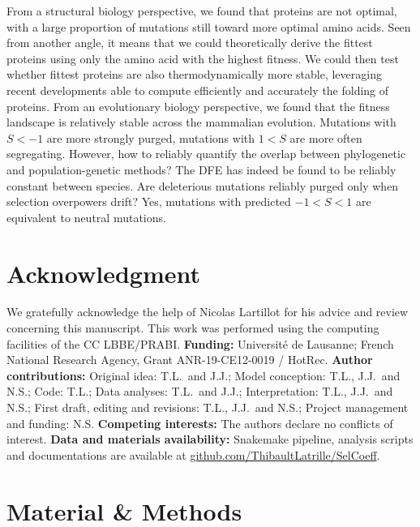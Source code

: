 \documentclass{article}
\newcommand{\Sphy}{S}
\begin{document}
    From a structural biology perspective, we found that proteins are not optimal, with a large proportion of mutations still toward more optimal amino acids.
    Seen from another angle, it means that we could theoretically derive the fittest proteins using only the amino acid with the highest fitness.
    We could then test whether fittest proteins are also thermodynamically more stable, leveraging recent developments able to compute efficiently and accurately the folding of proteins.
    From an evolutionary biology perspective, we found that the fitness landscape is relatively stable across the mammalian evolution.
    Mutations with $\Sphy<-1$ are more strongly purged, mutations with $1<\Sphy$ are more often segregating.
    However, how to reliably quantify the overlap between phylogenetic and population-genetic methods?
    The DFE has indeed be found to be reliably constant between species\cite{castellano_comparison_2019}.
    Are deleterious mutations reliably purged only when selection overpowers drift?
    Yes, mutations with predicted $-1<\Sphy<1$ are equivalent to neutral mutations.


    \section*{Acknowledgment}
    \label{sec:acknowledgment}
    We gratefully acknowledge the help of Nicolas Lartillot for his advice and review concerning this manuscript.
    This work was performed using the computing facilities of the CC LBBE/PRABI\@.
    \textbf{Funding:}
    Université de Lausanne;
    French National Research Agency, Grant ANR-19-CE12-0019 / HotRec.
    \textbf{Author contributions:}
    Original idea: T.L.\ and J.J.;
    Model conception: T.L., J.J.\ and N.S.;
    Code: T.L.;
    Data analyses: T.L.\ and J.J.;
    Interpretation: T.L., J.J.\ and N.S.;
    First draft, editing and revisions: T.L., J.J.\ and N.S.;
    Project management and funding: N.S\@.
    \textbf{Competing interests:}
    The authors declare no conflicts of interest.
    \textbf{Data and materials availability:}
    Snakemake pipeline, analysis scripts and documentations are available at \href{https://github.com/ThibaultLatrille/SelCoeff}{github.com/ThibaultLatrille/SelCoeff}.


    \section{Material \& Methods}
    \label{sec:methods}
\end{document}
